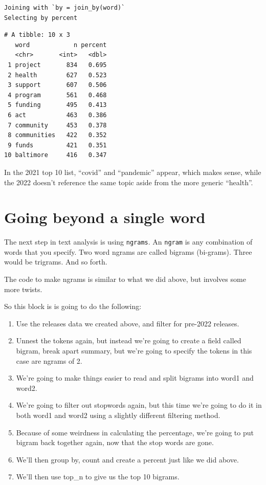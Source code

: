 \documentclass[
  letterpaper,
  DIV=11,
  numbers=noendperiod]{scrreprt}
\providecommand{\tightlist}{%
  \setlength{\itemsep}{0pt}\setlength{\parskip}{0pt}}\usepackage{longtable,booktabs,array}
\begin{document}
\begin{verbatim}
Joining with `by = join_by(word)`
Selecting by percent
\end{verbatim}

\begin{verbatim}
# A tibble: 10 x 3
   word            n percent
   <chr>       <int>   <dbl>
 1 project       834   0.695
 2 health        627   0.523
 3 support       607   0.506
 4 program       561   0.468
 5 funding       495   0.413
 6 act           463   0.386
 7 community     453   0.378
 8 communities   422   0.352
 9 funds         421   0.351
10 baltimore     416   0.347
\end{verbatim}

In the 2021 top 10 list, ``covid'' and ``pandemic'' appear, which makes
sense, while the 2022 doesn't reference the same topic aside from the
more generic ``health''.

\hypertarget{going-beyond-a-single-word}{%
\section{Going beyond a single word}\label{going-beyond-a-single-word}}

The next step in text analysis is using \texttt{ngrams}. An
\texttt{ngram} is any combination of words that you specify. Two word
ngrams are called bigrams (bi-grams). Three would be trigrams. And so
forth.

The code to make ngrams is similar to what we did above, but involves
some more twists.

So this block is is going to do the following:

\begin{enumerate}
\def\labelenumi{\arabic{enumi}.}
\tightlist
\item
  Use the releases data we created above, and filter for pre-2022
  releases.
\item
  Unnest the tokens again, but instead we're going to create a field
  called bigram, break apart summary, but we're going to specify the
  tokens in this case are ngrams of 2.
\item
  We're going to make things easier to read and split bigrams into word1
  and word2.
\item
  We're going to filter out stopwords again, but this time we're going
  to do it in both word1 and word2 using a slightly different filtering
  method.
\item
  Because of some weirdness in calculating the percentage, we're going
  to put bigram back together again, now that the stop words are gone.
\item
  We'll then group by, count and create a percent just like we did
  above.
\item
  We'll then use top\_n to give us the top 10 bigrams.
\end{enumerate}
\end{document}
